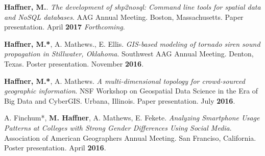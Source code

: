 \begin{cventries}
   \cventry
      {}
      {}
      {}
      {}
      {
        \begin{cvitems}
          \vspace{-4mm}
        \item {\textbf{Haffner, M.}.
            \textit{The development of shp2nosql: Command line tools for spatial
              data and NoSQL databases}. AAG Annual Meeting. Boston,
            Massachusetts. Paper presentation. April \textbf{2017} \textit{Forthcoming}.} \\
          \end{cvitems}
          }
   \cventry
      {}
      {}
      {}
      {}
      {
        \begin{cvitems}
          \vspace{-2mm}
            \item {\textbf{Haffner, M.*}, A. Mathews., E. Ellis.
                \textit{GIS-based modeling of tornado siren sound propagation in
                  Stillwater, Oklahoma}. Southwest AAG Annual Meeting. Denton,
                Texas. Poster  presentation. November \textbf{2016}.}
            \end{cvitems}
          }
   \cventry
      {}
      {}
      {}
      {}
      {
        \begin{cvitems}
          \vspace{-2mm}
        \item {\textbf{Haffner, M.*}, A. Mathews. \textit{A multi-dimensional topology for crowd-sourced geographic information}. NSF Workshop on Geospatial Data Science in the Era of Big Data and CyberGIS. Urbana, Illinois. Paper presentation. July \textbf{2016}.} 
          \end{cvitems}
              }
   \cventry
      {}
      {}
      {}
      {}
      {
        \begin{cvitems}
          \vspace{-2mm}
        \item A. Finchum*, {\textbf{M. Haffner}, A. Mathews, E. Fekete. \textit{Analyzing Smartphone Usage Patterns at Colleges with Strong Gender Differences Using Social Media}. Association of American Geographers Annual Meeting. San Franciso, California. Poster presentation. April \textbf{2016}.} 
            \end{cvitems}
            }
   \cventry
      {}
      {}
      {}
      {}
      {
        \begin{cvitems}

\end{cvitems}}
\end{cventries}
